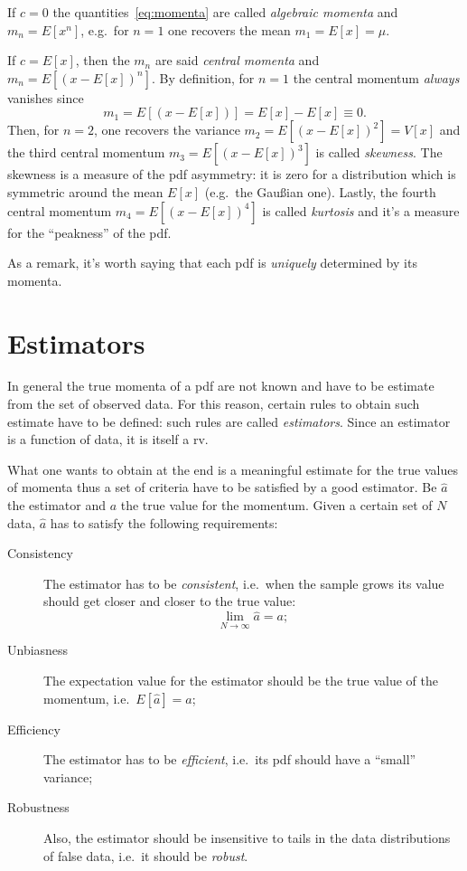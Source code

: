 If $c=0$ the quantities~\eqref{eq:momenta} are called \emph{algebraic momenta} and $m_n = E[x^n]$, e.g.~for $n = 1$ one recovers the mean $m_1 = E[x] = \mu$.

If $c = E[x]$, then the $m_n$ are said \emph{central momenta}  and $m_n = E[(x-E[x])^n]$.
By definition, for $n=1$ the central momentum \emph{always} vanishes since
\begin{equation}
	m_1 = E[(x-E[x])] = E[x]-E[x] \equiv 0.
\end{equation}
Then, for $n=2$, one recovers the variance $m_2 = E[(x-E[x])^2] = V[x]$ and the third central momentum $m_3 = E[(x-E[x])^3]$ is called \emph{skewness}.
The skewness is a measure of the \ac{pdf} asymmetry: it is zero for a distribution which is symmetric around the mean $E[x]$ (e.g.~the Gau\ss{}ian one).
Lastly, the fourth central momentum $m_4 = E[(x-E[x])^4]$ is called \emph{kurtosis} and it's a measure for the ``peakness'' of the \ac{pdf}.


As a remark, it's worth saying that each \ac{pdf} is \emph{uniquely} determined by its momenta.

\section{Estimators}

In general the true momenta of a \ac{pdf} are not known and have to be estimate from the set of observed data.
For this reason, certain rules to obtain such estimate have to be defined: such rules are called \emph{estimators}.
Since an estimator is a function of data, it is itself a \ac{rv}.


What one wants to obtain at the end is a meaningful estimate for the true values of momenta thus a set of criteria have to be satisfied by a good estimator.
Be $\hat a$ the estimator and $a$ the true value for the momentum.
Given a certain set of $N$ data, $\hat a$ has to satisfy the following requirements:
\begin{description}
	\item[Consistency] The estimator has to be \emph{consistent}, i.e.~when the sample grows its value should get closer and closer to the true value:
		\begin{equation}
			\lim_{N\to\infty}\hat{a} = a;
		\end{equation}

	\item[Unbiasness] The expectation value for the estimator should be the true value of the momentum, i.e.~$E[\hat a] = a$;

	\item[Efficiency] The estimator has to be \emph{efficient}, i.e.~its \ac{pdf} should have a ``small'' variance;

	\item[Robustness] Also, the estimator should be insensitive to tails in the data distributions of false data, i.e.~it should be \emph{robust}.

\end{description}


